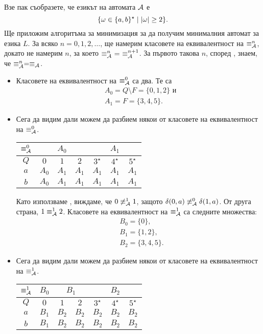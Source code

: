 \begin{extra2}
\begin{solution}
{      \writedown Взе пак съобразете, че езикът на автомата $\mathcal{A}$ е \[\{\omega \in \{a,b\}^\star \mid \vert{\omega}\vert \geq 2\}.\]}
  Ще приложим алгоритъма за минимизация за да получим минималния автомат за езика $L$.
  За всяко $n = 0,1,2,\dots$, ще намерим класовете на еквивалентност на $\equiv^n_{\mathcal{A}}$,
  докато не намерим $n$, за което $\equiv^n_\A\ =\ \equiv^{n+1}_\A$.
  За първото такова $n$, според , знаем, че $\equiv^n_{\mathcal{A}} = \equiv_{\mathcal{A}}$.
  \begin{itemize}
  \item 
    Класовете на еквивалентност на $\equiv^0_{\mathcal{A}}$ са два. Те са
    \begin{align*}
      & A_0 = Q\setminus F = \{0,1,2\}\text{ и }\\
      & A_1 = F = \{3,4,5\}.
    \end{align*}
  \item
    Сега да видим дали можем да разбием някои от класовете на еквивалентност на $\equiv^0_{\mathcal{A}}$.
    \begin{tabular}{|c|c|c|c|c|c|c|}
      \hline
      $\equiv^0_{\mathcal{A}}$ & \multicolumn{3}{|c|}{$A_0$} & \multicolumn{3}{|c|}{$A_1$}\\
      \hline
      \hline
      $Q$ & $0$ & $1$ & $2$ & $3^\star$ & $4^\star$ & $5^\star$ \\
      \hline
      $a$ & $A_0$& $A_1$ & $A_1$ & $A_1$ & $A_1$ & $A_1$\\
      \hline
      $b$ & $A_0$& $A_1$ & $A_1$ & $A_1$ & $A_1$ & $A_1$\\
      \hline
    \end{tabular}
    
    Като използваме , виждаме, че $0 \not\equiv^1_{\mathcal{A}} 1$, защото $\delta(0,a) \not\equiv^0_{\mathcal{A}} \delta(1,a)$.
    От друга страна, $1 \equiv^1_{\mathcal{A}} 2$.
    Класовете на еквивалентност на $\equiv^1_{\mathcal{A}}$ са следните множества:
    \begin{align*}
      & B_0 = \{0\},\\
      & B_1 = \{1,2\},\\
      & B_2 = \{3,4,5\}.
    \end{align*}
  \item
    Сега да видим дали можем да разбием някои от класовете на еквивалентност на $\equiv^1_{\mathcal{A}}$.
    
    \begin{tabular}{|c|c|c|c|c|c|c|}
      \hline
      $\equiv^1_{\mathcal{A}}$ & $B_0$ & \multicolumn{2}{|c|}{$B_1$} & \multicolumn{3}{|c|}{$B_2$}\\
      \hline
      \hline
      $Q$ & $0$ & $1$ & $2$ & $3^\star$ & $4^\star$ & $5^\star$ \\
      \hline
      $a$ & $B_1$ & $B_2$ & $B_2$ & $B_2$ & $B_2$ & $B_2$\\
      \hline
      $b$ & $B_1$ & $B_2$ & $B_2$ & $B_2$ & $B_2$ & $B_2$\\
      \hline
    \end{tabular}


\end{itemize}
\end{solution}
\end{extra2}
